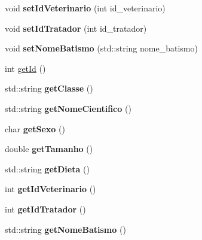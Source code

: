 \begin{DoxyCompactItemize}
\item 
\mbox{\label{classAnimal_abbd8ca73c60dbaa6677ea94d7c0db175}} 
void {\bfseries set\+Id\+Veterinario} (int id\+\_\+veterinario)
\item 
\mbox{\label{classAnimal_a795fd39a3a7a96423fa46bb7b4cdef4f}} 
void {\bfseries set\+Id\+Tratador} (int id\+\_\+tratador)
\item 
\mbox{\label{classAnimal_a6f77d89ef0c02d85dfe1dd7508122ce3}} 
void {\bfseries set\+Nome\+Batismo} (std\+::string nome\+\_\+batismo)
\item 
int \hyperlink{classAnimal_a2c27e56355bc2b40d65250da2bb8a102}{get\+Id} ()
\item 
\mbox{\label{classAnimal_a22e54ff48117237f9a201f5eca0eea81}} 
std\+::string {\bfseries get\+Classe} ()
\item 
\mbox{\label{classAnimal_a9b316bf80a121cd5dc077158055c162f}} 
std\+::string {\bfseries get\+Nome\+Cientifico} ()
\item 
\mbox{\label{classAnimal_a7349027418d900a9cd7cfc32001b6f7d}} 
char {\bfseries get\+Sexo} ()
\item 
\mbox{\label{classAnimal_a3936ff4ad07fee3173db2a9dff52c706}} 
double {\bfseries get\+Tamanho} ()
\item 
\mbox{\label{classAnimal_a6fcb9a0b8debecb58ca20dbf88bce329}} 
std\+::string {\bfseries get\+Dieta} ()
\item 
\mbox{\label{classAnimal_a4658caf142f17472741034ef901f33af}} 
int {\bfseries get\+Id\+Veterinario} ()
\item 
\mbox{\label{classAnimal_af58206a25d1c63316a967632061a99f5}} 
int {\bfseries get\+Id\+Tratador} ()
\item 
\mbox{\label{classAnimal_aee0219bd596f0af49fa51fcdad29a1a7}} 
std\+::string {\bfseries get\+Nome\+Batismo} ()
\end{DoxyCompactItemize}
